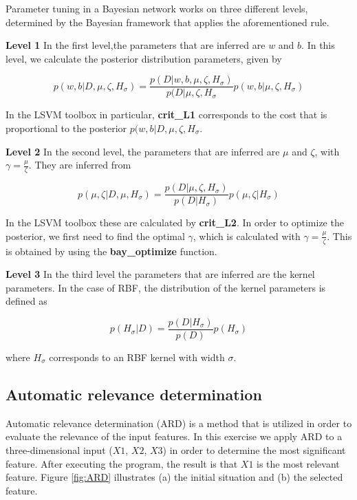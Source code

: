\documentclass[a4paper, 11pt, one column]{article}
\begin{document}
Parameter tuning in a Bayesian network works on three different levels, determined by the Bayesian framework that applies the aforementioned rule. 

\textbf{Level 1}
In the first level,the parameters that are inferred are $w$ and $b$. In this level, we calculate the posterior distribution parameters, given by

\begin{equation}
p(w,b|D,\mu,\zeta,H_\sigma) = \frac{p(D|w,b,\mu,\zeta,H_\sigma)}{p(D|\mu,\zeta,H_\sigma}p(w,b|\mu,\zeta,H_\sigma)
\end{equation}

In the LSVM toolbox in particular, \textbf{crit\_L1} corresponds to the cost that is proportional to the posterior $p(w,b|D,\mu,\zeta,H_\sigma$. 

\textbf{Level 2}
In the second level, the parameters that are inferred are $\mu$ and $\zeta$, with $\gamma = \frac{\mu}{\zeta}$. They are inferred from

\begin{equation}
p(\mu,\zeta|D,\mu,H_\sigma) = \frac{p(D|\mu,\zeta,H_\sigma)}{p(D|H_\sigma)}p(\mu,\zeta|H_\sigma)
\end{equation}

In the LSVM toolbox these are calculated by \textbf{crit\_L2}. In order to optimize the posterior, we first need to find the optimal $\gamma$, which is calculated with $\gamma = \frac{\mu}{\zeta}$. This is obtained by using the \textbf{bay\_optimize} function.

\textbf{Level 3}
In the third level the parameters that are inferred are the kernel parameters. In the case of RBF, the distribution of the kernel parameters is defined as

\begin{equation}
    p(H_\sigma|D) = \frac{p(D|H_\sigma)}{p(D)}p(H_\sigma)
\end{equation}

where $H_\sigma$ corresponds to an RBF kernel with width $\sigma$.
\subsection{Automatic relevance determination}
Automatic relevance determination (ARD) is a method that is utilized in order to evaluate the relevance of the input features. In this exercise we apply ARD to a three-dimensional input ($X1$, $X2$, $X3$) in order to determine the most significant feature. After executing the program, the result is that $X1$ is the most relevant feature. Figure \ref{fig:ARD} illustrates (a) the initial situation and (b) the selected feature.
\end{document}
